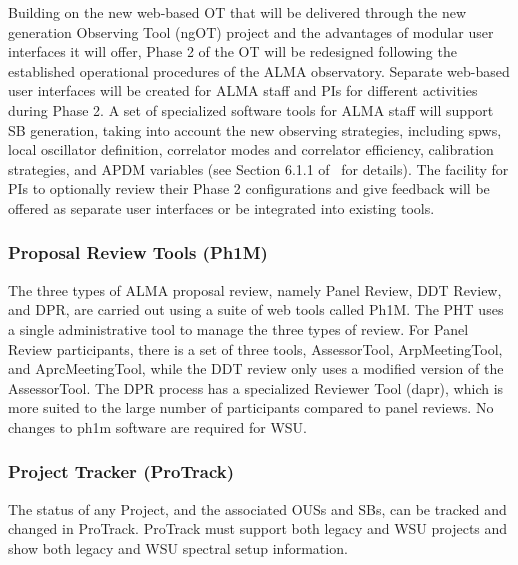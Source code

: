 Building on the new web-based OT that will be delivered through the new generation Observing Tool (ngOT)  project and the advantages of modular user interfaces it will offer, Phase 2 of the OT will be redesigned following the established operational procedures of the ALMA observatory. Separate web-based user interfaces will be created for ALMA staff and PIs for different activities during Phase 2. A set of specialized software tools for ALMA staff will support SB generation, taking into account the new observing strategies, including \acp{spw}, local oscillator definition, correlator modes and correlator efficiency, calibration strategies, and \ac{APDM} variables (see Section 6.1.1 of~\cite{CSA-IA} for details). The facility for PIs to optionally review their Phase 2 configurations and give feedback will be offered as separate user interfaces or be integrated into existing tools.



\subsubsection{Proposal Review Tools (Ph1M) }\label{subsec:ph1m}

The three types of ALMA proposal review, namely Panel Review, \ac{DDT} Review, and \ac{DPR}, are carried out using a suite of web tools called \ac{Ph1M}. The \ac{PHT} uses a single administrative tool to manage the three types of review. For Panel Review participants, there is a set of three tools, AssessorTool, ArpMeetingTool, and AprcMeetingTool, while the \ac{DDT} review only uses a modified version of the AssessorTool. The \ac{DPR} process has a specialized Reviewer Tool (dapr), which is more suited to the large number of participants compared to panel reviews. No changes to ph1m software are required for WSU.


\subsubsection{Project Tracker (ProTrack)}
\label{sec:pro_track}

The status of any Project, and the associated \acp{OUS} and \acp{SB}, can be tracked and changed in \ac{ProTrack}. ProTrack must support both legacy and WSU projects and show both legacy and WSU spectral setup information.

